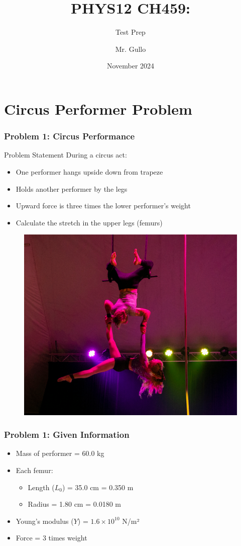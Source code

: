 \documentclass{beamer}
\title[Unit 2 Review]{PHYS12 CH459:}
\subtitle{Test Prep}
\author[Mr. Gullo]{Mr. Gullo}
\date[Nov 2024]{November 2024}
\begin{document}
\frame{\titlepage}


\section{Circus Performer Problem}

\begin{frame}
\frametitle{Problem 1: Circus Performance}
\begin{block}{Problem Statement}
During a circus act:
\begin{itemize}
    \item One performer hangs upside down from trapeze
    \item Holds another performer by the legs
    \item Upward force is three times the lower performer's weight
    \item Calculate the stretch in the upper legs (femurs)
\end{itemize}
\end{block}
\begin{figure}
    \centering
    \includegraphics[width=0.5\linewidth]{CH9.5 4,5,9 Review/Screenshot 2024-11-12 100229.png}
\end{figure}

\end{frame}

\begin{frame}
\frametitle{Problem 1: Given Information}
\begin{itemize}
    \item Mass of performer = 60.0 kg
    \item Each femur:
    \begin{itemize}
        \item Length ($L_0$) = 35.0 cm = 0.350 m
        \item Radius = 1.80 cm = 0.0180 m
    \end{itemize}
    \item Young's modulus ($Y$) = $1.6 \times 10^{10}$ N/m²
    \item Force = 3 times weight
\end{itemize}
\end{frame}
\end{document}
